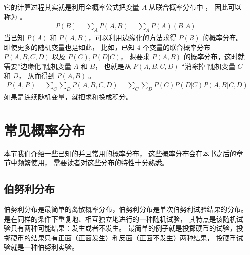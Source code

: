 \documentclass[letterpaper,10pt,english]{sphinxmanual}
\begin{document}
它的计算过程其实就是利用全概率公式把变量 \(A\) 从联合概率分布中 ，
因此可以称为 。
\begin{equation}\label{equation:概率基础/content:概率基础/content:52}
\begin{split}P(B) = \sum_A P(A,B) = \sum_A P(A)(B|A)\end{split}
\end{equation}
当已知 \(P(A)\) 和 \(P(A,B)\)，可以利用边缘化的方法求得 \(P(B)\) 的概率分布。
即使更多的随机变量也是如此，
比如，已知 \(4\) 个变量的联合概率分布 \(P(A,B,C,D)\) 以及 \(P(C),P(D|C)\)，
想要求 \(P(A,B)\) 的概率分布，这时就需要”边缘化”随机变量 \(A\) 和 \(B\)，
也就是从 \(P(A,B,C,D)\) “消除掉”随机变量 \(C\) 和 \(D\)，
从而得到 \(P(A,B)\) 。
\begin{equation}\label{equation:概率基础/content:概率基础/content:53}
\begin{split}P(A,B) = \sum_C \sum_D P(A,B,C,D) = \sum_C \sum_D P(C) P(D|C) P(A,B|C,D)\end{split}
\end{equation}
如果是连续随机变量，就把求和换成积分。


\section{常见概率分布}
\label{\detokenize{_u6982_u7387_u57fa_u7840/content:id17}}
本节我们介绍一些已知的并且常用的概率分布，
这些概率分布会在本书之后的章节中频繁使用，
需要读者对这些分布的特性十分熟悉。


\subsection{伯努利分布}
\label{\detokenize{_u6982_u7387_u57fa_u7840/content:id18}}
伯努利分布是最简单的离散概率分布，伯努利分布是单次伯努利试验结果的分布。
 是在同样的条件下重复地、相互独立地进行的一种随机试验，
其特点是该随机试验只有两种可能结果：发生或者不发生。
最简单的例子就是投掷硬币的试验，投掷硬币的结果只有正面（正面发生）和反面（正面不发生）两种结果，
投硬币试验就是一种伯努利实验。
\end{document}
